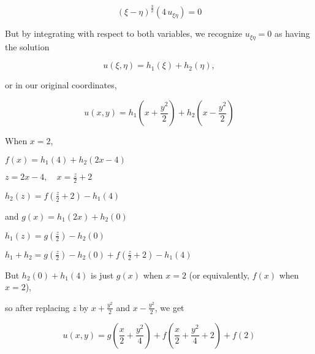 \documentclass[
]{article}
\begin{document}
\[\left(\xi-\eta \right)^{\frac{3}{2}} \left(4\, u_{\xi \eta}\right)=0\]

But by integrating with respect to both variables, we recognize
\(u_{\xi \eta}=0\) as having the solution

\[u(\xi, \eta)=h_1(\xi)+h_2(\eta),\]

or in our original coordinates,

\[u(x,y)=h_1\left(x+\frac{y^2}{2}\right)+h_2\left(x-\frac{y^2}{2}\right) \]

When \(x=2\),

\(f(x)=h_1(4)+h_2(2x-4)\)

\(z=2x-4, \quad x=\frac{z}{2} + 2\)

\(h_2(z)=f\left(\frac{z}{2}+2\right)-h_1(4)\)

and \(g(x)=h_1(2x)+h_2(0)\)

\(h_1(z)=g\left(\frac{z}{2}\right)-h_2(0)\)

\(h_1+h_2=g\left(\frac{z}{2}\right)-h_2(0)+f(\frac{z}{2} + 2)-h_1(4)\)

But \(h_2(0)+h_1(4)\) is just \(g(x)\) when \(x=2\) (or equivalently,
\(f(x)\) when \(x=2\)),

so after replacing \(z\) by \(x+\frac{y^2}{2}\) and \(x-\frac{y^2}{2}\),
we get

\begin{tcolorbox}[colback=white, title=Solution]
$$u(x,y)=g\left(\frac{x}{2}+\frac{y^2}{4}\right)+f\left(\frac{x}{2}+\frac{y^2}{4}+2\right)+f(2)$$
\end{tcolorbox}
\end{document}
